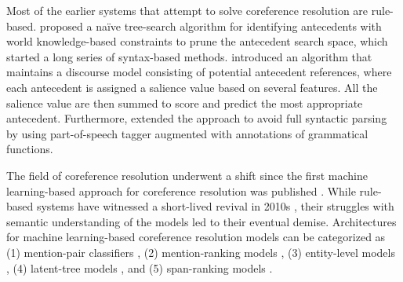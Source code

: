 \documentclass[11pt]{article}
\begin{document}
Most of the earlier systems that attempt to solve coreference resolution are rule-based. \textcite{hobbs1978} proposed a naïve tree-search algorithm for identifying antecedents with world knowledge-based constraints to prune the antecedent search space, which started a long series of syntax-based methods. \textcite{lappin1994} introduced an algorithm that maintains a discourse model consisting of potential antecedent references, where each antecedent is assigned a salience value based on several features. All the salience value are then summed to score and predict the most appropriate antecedent. Furthermore, \textcite{kennedy1996} extended the approach to avoid full syntactic parsing by using part-of-speech tagger augmented with annotations of grammatical functions.

The field of coreference resolution underwent a shift since the first machine learning-based approach for coreference resolution was published \parencite{ConnollyEtAl:94}. While rule-based systems have witnessed a short-lived revival in 2010s \parencite{zhou2004, haghighi2009}, their struggles with semantic understanding of the models led to their eventual demise. Architectures for machine learning-based coreference resolution models can be categorized as (1) mention-pair classifiers \parencite{ng2002identifying,bengtson2008understanding}, (2) mention-ranking models \parencite{durrett2013easy,wiseman2015learning,clark2016deep,denis-baldridge-2008-specialized}, (3) entity-level models \parencite{haghighi-klein-2010-coreference,wiseman-etal-2016-learning,clark-manning-2015-entity,clark-manning-2016-improving}, (4) latent-tree models \parencite{fernandes-etal-2012-latent,martschat-strube-2015-latent,bjorkelund-kuhn-2014-learning}, and (5) span-ranking models \parencite{lee2017end,lee2018higher,joshi2019coref}.

\end{document}
